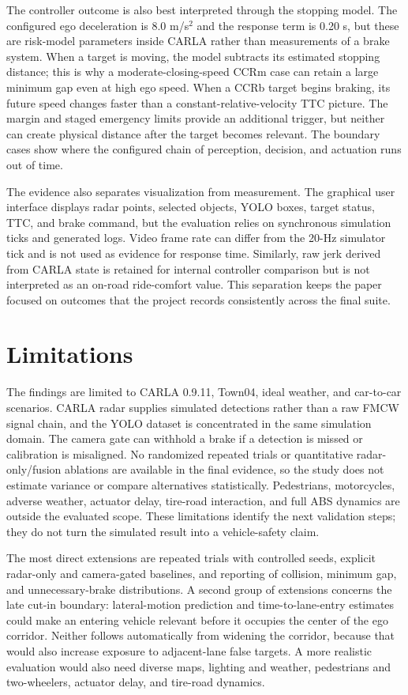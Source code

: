 \documentclass[conference]{IEEEtran}
\begin{document}
The controller outcome is also best interpreted through the stopping model. The
configured ego deceleration is 8.0 m/s$^2$ and the response term is 0.20 s, but
these are risk-model parameters inside CARLA rather than measurements of a
brake system. When a target is moving, the model subtracts its estimated stopping
distance; this is why a moderate-closing-speed CCRm case can retain a large
minimum gap even at high ego speed. When a CCRb target begins braking, its future
speed changes faster than a constant-relative-velocity TTC picture. The margin
and staged emergency limits provide an additional trigger, but neither can create
physical distance after the target becomes relevant. The boundary cases show
where the configured chain of perception, decision, and actuation runs out of
time.

The evidence also separates visualization from measurement. The graphical user
interface displays radar points, selected objects, YOLO boxes, target status,
TTC, and brake command, but the evaluation relies on synchronous simulation
ticks and generated logs. Video frame rate can differ from the 20-Hz simulator
tick and is not used as evidence for response time. Similarly, raw jerk derived
from CARLA state is retained for internal controller comparison but is not
interpreted as an on-road ride-comfort value. This separation keeps the paper
focused on outcomes that the project records consistently across the final suite.

\section{Limitations}
The findings are limited to CARLA 0.9.11, Town04, ideal weather, and car-to-car
scenarios. CARLA radar supplies simulated detections rather than a raw FMCW
signal chain, and the YOLO dataset is concentrated in the same simulation domain.
The camera gate can withhold a brake if a detection is missed or calibration is
misaligned. No randomized repeated trials or quantitative radar-only/fusion
ablations are available in the final evidence, so the study does not estimate
variance or compare alternatives statistically. Pedestrians, motorcycles,
adverse weather, actuator delay, tire-road interaction, and full ABS dynamics
are outside the evaluated scope. These limitations identify the next validation
steps; they do not turn the simulated result into a vehicle-safety claim.

The most direct extensions are repeated trials with controlled seeds, explicit
radar-only and camera-gated baselines, and reporting of collision, minimum gap,
and unnecessary-brake distributions. A second group of extensions concerns the
late cut-in boundary: lateral-motion prediction and time-to-lane-entry estimates
could make an entering vehicle relevant before it occupies the center of the
ego corridor. Neither follows automatically from widening the corridor, because
that would also increase exposure to adjacent-lane false targets. A more realistic
evaluation would also need diverse maps, lighting and weather, pedestrians and
two-wheelers, actuator delay, and tire-road dynamics.
\end{document}
